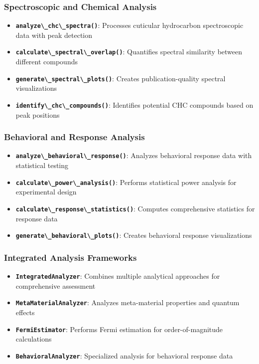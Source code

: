\documentclass[
  13pt,
  a4paperpaper,
  12pt]{article}
\newcommand{\passthrough}[1]{#1}
\providecommand{\tightlist}{%
  \setlength{\itemsep}{0pt}\setlength{\parskip}{0pt}}
\begin{document}
\subsubsection{Spectroscopic and Chemical
Analysis}\label{spectroscopic-and-chemical-analysis}

\begin{itemize}
\tightlist
\item
  \textbf{\passthrough{\lstinline!analyze\_chc\_spectra()!}}: Processes
  cuticular hydrocarbon spectroscopic data with peak detection
\item
  \textbf{\passthrough{\lstinline!calculate\_spectral\_overlap()!}}:
  Quantifies spectral similarity between different compounds
\item
  \textbf{\passthrough{\lstinline!generate\_spectral\_plots()!}}:
  Creates publication-quality spectral visualizations
\item
  \textbf{\passthrough{\lstinline!identify\_chc\_compounds()!}}:
  Identifies potential CHC compounds based on peak positions
\end{itemize}

\subsubsection{Behavioral and Response
Analysis}\label{behavioral-and-response-analysis}

\begin{itemize}
\tightlist
\item
  \textbf{\passthrough{\lstinline!analyze\_behavioral\_response()!}}:
  Analyzes behavioral response data with statistical testing
\item
  \textbf{\passthrough{\lstinline!calculate\_power\_analysis()!}}:
  Performs statistical power analysis for experimental design
\item
  \textbf{\passthrough{\lstinline!calculate\_response\_statistics()!}}:
  Computes comprehensive statistics for response data
\item
  \textbf{\passthrough{\lstinline!generate\_behavioral\_plots()!}}:
  Creates behavioral response visualizations
\end{itemize}

\subsubsection{Integrated Analysis
Frameworks}\label{integrated-analysis-frameworks}

\begin{itemize}
\tightlist
\item
  \textbf{\passthrough{\lstinline!IntegratedAnalyzer!}}: Combines
  multiple analytical approaches for comprehensive assessment
\item
  \textbf{\passthrough{\lstinline!MetaMaterialAnalyzer!}}: Analyzes
  meta-material properties and quantum effects
\item
  \textbf{\passthrough{\lstinline!FermiEstimator!}}: Performs Fermi
  estimation for order-of-magnitude calculations
\item
  \textbf{\passthrough{\lstinline!BehavioralAnalyzer!}}: Specialized
  analysis for behavioral response data
\end{itemize}
\end{document}
